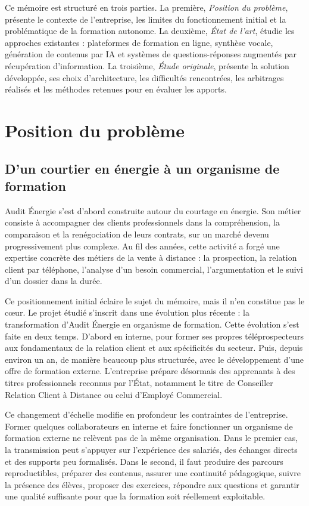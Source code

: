 \documentclass[12pt,a4paper]{article}
\begin{document}
Ce mémoire est structuré en trois parties. La première, \emph{Position du problème}, présente
le contexte de l'entreprise, les limites du fonctionnement initial et la problématique de la
formation autonome. La deuxième, \emph{État de l'art}, étudie les approches existantes :
plateformes de formation en ligne, synthèse vocale, génération de contenus par IA et systèmes
de questions-réponses augmentés par récupération d'information. La troisième, \emph{Étude
originale}, présente la solution développée, ses choix d'architecture, les difficultés
rencontrées, les arbitrages réalisés et les méthodes retenues pour en évaluer les apports.

\clearpage
\section{Position du problème}

\subsection{D'un courtier en énergie à un organisme de formation}

Audit Énergie s'est d'abord construite autour du courtage en énergie. Son métier consiste
à accompagner des clients professionnels dans la compréhension, la comparaison et la
renégociation de leurs contrats, sur un marché devenu progressivement plus complexe. Au
fil des années, cette activité a forgé une expertise concrète des métiers de la vente à
distance : la prospection, la relation client par téléphone, l'analyse d'un besoin
commercial, l'argumentation et le suivi d'un dossier dans la durée.

Ce positionnement initial éclaire le sujet du mémoire, mais il n'en constitue pas le cœur.
Le projet étudié s'inscrit dans une évolution plus récente : la transformation d'Audit
Énergie en organisme de formation. Cette évolution s'est faite en deux temps. D'abord en
interne, pour former ses propres téléprospecteurs aux fondamentaux de la relation client
et aux spécificités du secteur. Puis, depuis environ un an, de manière beaucoup plus
structurée, avec le développement d'une offre de formation externe. L'entreprise prépare
désormais des apprenants à des titres professionnels reconnus par l'État, notamment le
titre de Conseiller Relation Client à Distance ou celui d'Employé Commercial.

Ce changement d'échelle modifie en profondeur les contraintes de l'entreprise. Former
quelques collaborateurs en interne et faire fonctionner un organisme de formation externe
ne relèvent pas de la même organisation. Dans le premier cas, la transmission peut
s'appuyer sur l'expérience des salariés, des échanges directs et des supports peu
formalisés. Dans le second, il faut produire des parcours reproductibles, préparer des
contenus, assurer une continuité pédagogique, suivre la présence des élèves, proposer des
exercices, répondre aux questions et garantir une qualité suffisante pour que la formation
soit réellement exploitable.
\end{document}
